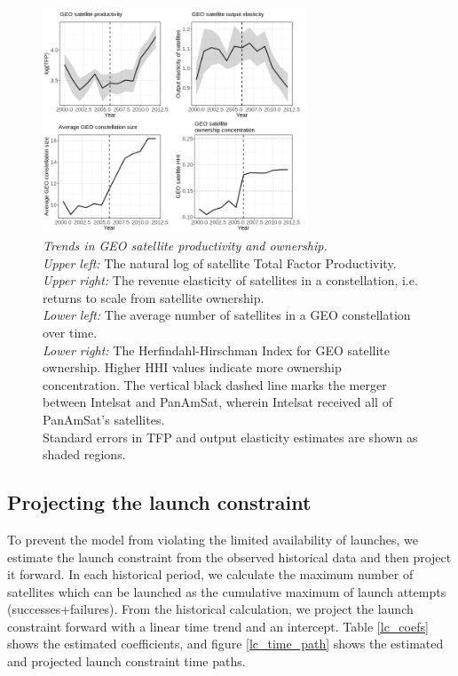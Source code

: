 \documentclass[12pt]{article}
\begin{document}
\begin{figure}[H]
	\centering
	\includegraphics[width=0.7\textwidth]{../../images/GEO_satellite_productivity.png}
	\captionsetup{format=hang}
	\caption[Trends in GEO satellite productivity and ownership]{\textit{Trends in GEO satellite productivity and ownership.} \\
		\textit{Upper left:} The natural log of satellite Total Factor Productivity. \\
		\textit{Upper right:} The revenue elasticity of satellites in a constellation, i.e. returns to scale from satellite ownership. \\
		\textit{Lower left:} The average number of satellites in a GEO constellation over time. \\
		\textit{Lower right:} The Herfindahl-Hirschman Index for GEO satellite ownership. Higher HHI values indicate more ownership concentration. The vertical black dashed line marks the merger between Intelsat and PanAmSat, wherein Intelsat received all of PanAmSat's satellites. \\
		Standard errors in TFP and output elasticity estimates are shown as shaded regions.
	}
	\label{GEO_satellite_productivity}
\end{figure}

\subsection{Projecting the launch constraint}
\label{launch_constraint}

To prevent the model from violating the limited availability of launches, we estimate the launch constraint from the observed historical data and then project it forward. In each historical period, we calculate the maximum number of satellites which can be launched as the cumulative maximum of launch attempts (successes+failures). From the historical calculation, we project the launch constraint forward with a linear time trend and an intercept. Table \ref{lc_coefs} shows the estimated coefficients, and figure \ref{lc_time_path} shows the estimated and projected launch constraint time paths.
\end{document}
